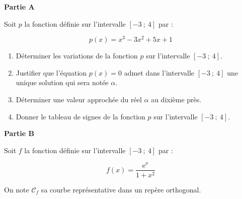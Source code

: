 \bigskip

\textbf{Partie A}

\medskip 

Soit $p$ la fonction définie sur l'intervalle $[-3~;~4]$ par :

\[p(x) = x^3 - 3x^2 + 5x + 1\]

\begin{enumerate}
\item Déterminer les variations de la fonction $p$ sur l'intervalle $[-3~;~4]$.
\item Justifier que l'équation $p(x) = 0$ admet dans l'intervalle $[-3~;~4]$ une unique solution qui sera notée $\alpha$.
\item Déterminer une valeur approchée du réel $\alpha$ au dixième près.
\item Donner le tableau de signes de la fonction $p$ sur l'intervalle $[-3~;~4]$. 
\end{enumerate}

\bigskip

\textbf{Partie B}

\medskip 

Soit $f$ la fonction définie sur l'intervalle $[-3~;~4]$ par :

\[f(x) = \dfrac{\text{e}^x}{1 + x^2}\]

On note $\mathcal{C}_f$ sa courbe représentative dans un repère orthogonal.

\medskip

